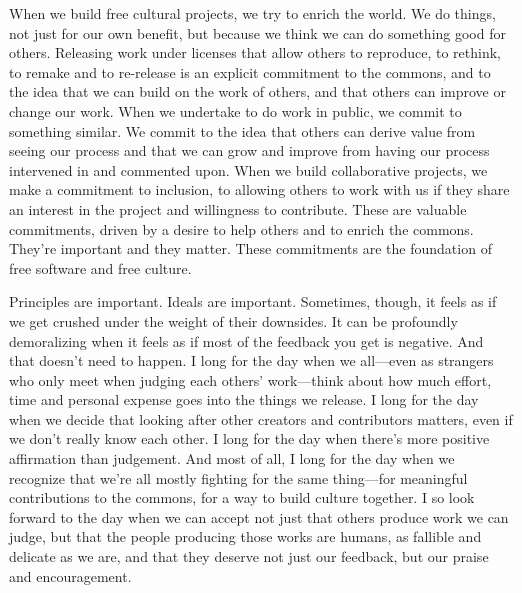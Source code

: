 When we build free cultural projects, we try to enrich the world. We do
things, not just for our own benefit, but because we think we can do
something good for others. Releasing work under licenses that allow
others to reproduce, to rethink, to remake and to re-release is an
explicit commitment to the commons, and to the idea that we can build on
the work of others, and that others can improve or change our work. When
we undertake to do work in public, we commit to something similar. We
commit to the idea that others can derive value from seeing our process
and that we can grow and improve from having our process intervened in
and commented upon. When we build collaborative projects, we make a
commitment to inclusion, to allowing others to work with us if they
share an interest in the project and willingness to contribute. These
are valuable commitments, driven by a desire to help others and to
enrich the commons. They're important and they matter. These commitments
are the foundation of free software and free culture.

Principles are important. Ideals are important. Sometimes, though, it
feels as if we get crushed under the weight of their downsides. It can
be profoundly demoralizing when it feels as if most of the feedback you
get is negative. And that doesn't need to happen. I long for the day
when we all---even as strangers who only meet when judging each others'
work---think about how much effort, time and personal expense goes into
the things we release. I long for the day when we decide that looking
after other creators and contributors matters, even if we don't really
know each other. I long for the day when there's more positive
affirmation than judgement. And most of all, I long for the day when we
recognize that we're all mostly fighting for the same thing---for
meaningful contributions to the commons, for a way to build culture
together. I so look forward to the day when we can accept not just that
others produce work we can judge, but that the people producing those
works are humans, as fallible and delicate as we are, and that they
deserve not just our feedback, but our praise and encouragement.
